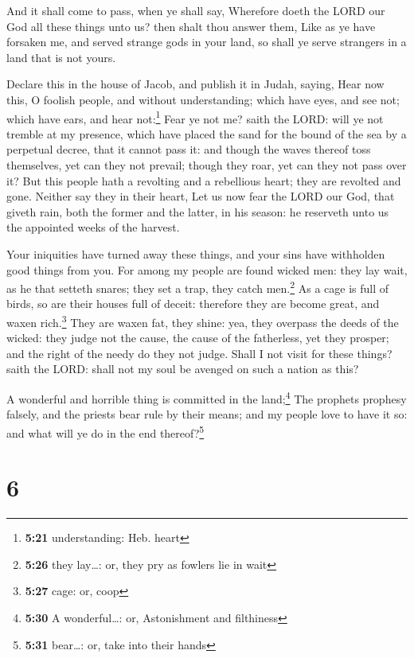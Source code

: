 And it shall come to pass, when ye shall say, Wherefore
doeth the LORD our God all these things unto us? then shalt thou answer
them, Like as ye have forsaken me, and served strange gods in your land,
so shall ye serve strangers in a land that is not yours.

 Declare this in the house of Jacob, and publish it in
Judah, saying,  Hear now this, O foolish people, and
without understanding; which have eyes, and see not; which have ears,
and hear not:\footnote{\textbf{5:21} understanding: Heb. heart}
 Fear ye not me? saith the LORD: will ye not tremble at
my presence, which have placed the sand for the bound of the sea by a
perpetual decree, that it cannot pass it: and though the waves thereof
toss themselves, yet can they not prevail; though they roar, yet can
they not pass over it?  But this people hath a revolting
and a rebellious heart; they are revolted and gone. 
Neither say they in their heart, Let us now fear the LORD our God, that
giveth rain, both the former and the latter, in his season: he reserveth
unto us the appointed weeks of the harvest.

 Your iniquities have turned away these things, and your
sins have withholden good things from you.  For among my
people are found wicked men: they lay wait, as he that setteth snares;
they set a trap, they catch men.\footnote{\textbf{5:26} they lay\ldots:
  or, they pry as fowlers lie in wait}  As a cage is full
of birds, so are their houses full of deceit: therefore they are become
great, and waxen rich.\footnote{\textbf{5:27} cage: or, coop}
 They are waxen fat, they shine: yea, they overpass the
deeds of the wicked: they judge not the cause, the cause of the
fatherless, yet they prosper; and the right of the needy do they not
judge.  Shall I not visit for these things? saith the
LORD: shall not my soul be avenged on such a nation as this?

 A wonderful and horrible thing is committed in the
land;\footnote{\textbf{5:30} A wonderful\ldots: or, Astonishment and
  filthiness}  The prophets prophesy falsely, and the
priests bear rule by their means; and my people love to have it so: and
what will ye do in the end thereof?\footnote{\textbf{5:31} bear\ldots:
  or, take into their hands}

\hypertarget{section-5}{%
\section{6}\label{section-5}}

